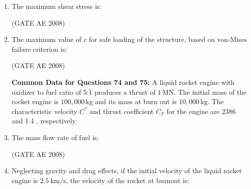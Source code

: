 \documentclass[journal,12pt,onecolumn]{IEEEtran}
\theoremstyle{remark}
\begin{document}
\begin{enumerate}
\quad 

\item The maximum shear stress is: 
\begin{enumerate}
\end{enumerate}
\hfill(GATE AE 2008)

\quad 

\item The maximum value of $c $ for safe loading of the structure, based on von-Mises failure criterion is:  
\begin{enumerate}
\end{enumerate}
\hfill(GATE AE 2008)

\quad 

\textbf{Common Data for Questions 74 and 75:}  
A liquid rocket engine with oxidizer to fuel ratio of 5:1 produces a thrust of $ 1 \, \text{MN} $.  
The initial mass of the rocket engine is $ 100{,}000 \, \text{kg} $ and its mass at burn out is $10{,}000 \, \text{kg} $.  
The characteristic velocity $C^* $ and thrust coefficient $C_F $ for the engine are 2386   and 1.4 , respectively.

\item The mass flow rate of fuel is:  
\begin{enumerate}
\end{enumerate}
\hfill(GATE AE 2008)

\quad 

\item Neglecting gravity and drag effects, if the initial velocity of the liquid rocket engine is $2.5 \ \text{km/s}$, the velocity of the rocket at burnout is:  


\end{enumerate}
\end{document}
